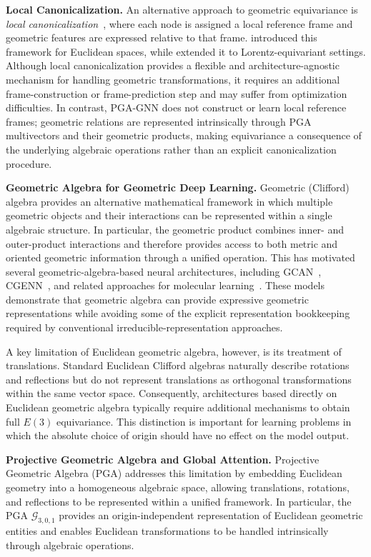 \documentclass[10pt]{article}
\begin{document}
\noindent\textbf{Local Canonicalization.}
An alternative approach to geometric equivariance is \emph{local canonicalization}~\citep{loca,lloca,clofnet}, where each node is assigned a local reference frame and geometric features are expressed relative to that frame. \citet{loca} introduced this framework for Euclidean spaces, while \citet{lloca} extended it to Lorentz-equivariant settings. Although local canonicalization provides a flexible and architecture-agnostic mechanism for handling geometric transformations, it requires an additional frame-construction or frame-prediction step and may suffer from optimization difficulties. In contrast, PGA-GNN does not construct or learn local reference frames; geometric relations are represented intrinsically through PGA multivectors and their geometric products, making equivariance a consequence of the underlying algebraic operations rather than an explicit canonicalization procedure.

\noindent\textbf{Geometric Algebra for Geometric Deep Learning.}
Geometric (Clifford) algebra provides an alternative mathematical framework in which multiple geometric objects and their interactions can be represented within a single algebraic structure. In particular, the geometric product combines inner- and outer-product interactions and therefore provides access to both metric and oriented geometric information through a unified operation. This has motivated several geometric-algebra-based neural architectures, including GCAN~\citep{gcan}, CGENN~\citep{cgenn}, and related approaches for molecular learning~\citep{qm9gagnn}. These models demonstrate that geometric algebra can provide expressive geometric representations while avoiding some of the explicit representation bookkeeping required by conventional irreducible-representation approaches.

A key limitation of Euclidean geometric algebra, however, is its treatment of translations. Standard Euclidean Clifford algebras naturally describe rotations and reflections but do not represent translations as orthogonal transformations within the same vector space. Consequently, architectures based directly on Euclidean geometric algebra typically require additional mechanisms to obtain full $E(3)$ equivariance. This distinction is important for learning problems in which the absolute choice of origin should have no effect on the model output.

\noindent\textbf{Projective Geometric Algebra and Global Attention.}
Projective Geometric Algebra (PGA) addresses this limitation by embedding Euclidean geometry into a homogeneous algebraic space, allowing translations, rotations, and reflections to be represented within a unified framework. In particular, the PGA $\mathcal{G}_{3,0,1}$ provides an origin-independent representation of Euclidean geometric entities and enables Euclidean transformations to be handled intrinsically through algebraic operations.
\end{document}
